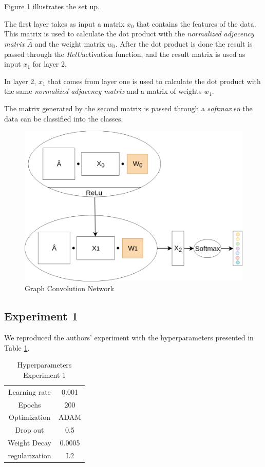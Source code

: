 Figure \ref{fig:model} illustrates the set up.

The first layer takes as input a matrix $x_{0}$ that contains the features of the data. This matrix is used to calculate the dot product with the \textit{normalized adjacency matrix} $\hat{A}$ and the weight matrix $w_{0}$. After the dot product is done the result is passed through the \textit{RelU}activation function, and the result matrix is used as input $x_{1}$ for layer 2.

In layer 2, $x_{1}$ that comes from layer one is used to calculate the dot product with the same \textit{normalized adjacency matrix} and a matrix of weights $w_{1}$.

The matrix generated by the second matrix is passed through a \textit{softmax} so the data can be classified into the classes.

\begin{figure}[h!]
  \centering
  \includegraphics[width=0.8\linewidth]{media/model.png}
  \caption{Graph Convolution Network}
  \label{fig:model}
\end{figure}

\subsection{Experiment 1}

We reproduced the authors' experiment with  the hyperparameters presented in Table \ref{tab:hyperparameters1}.

\begin {table}[ht]
\caption {Hyperparameters Experiment 1} \label{tab:hyperparameters1} 
  \begin{center}
    \begin{tabular}{|c|c|}
    \hline
    Learning rate     & 0.001 \\ 
    Epochs            & 200  \\ 
    Optimization      & ADAM \\
    Drop out          & 0.5   \\
    Weight Decay      & 0.0005 \\
    regularization    & L2    \\
    \hline
    \end{tabular}
  \end{center}
\end{table}

